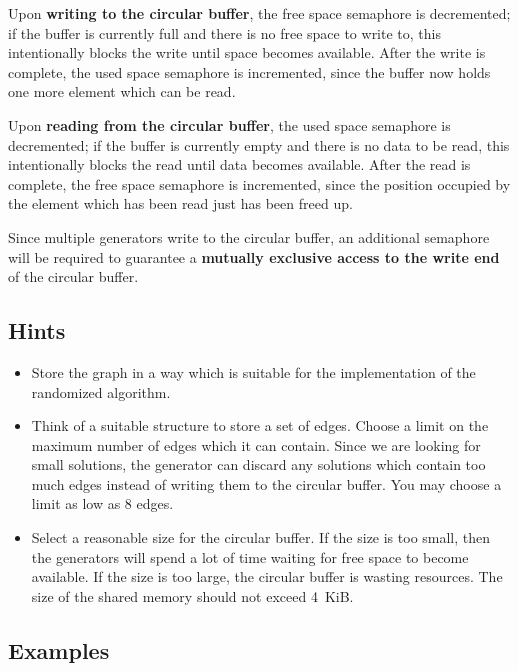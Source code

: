 Upon \textbf{writing to the circular buffer}, the free space semaphore is decremented;
if the buffer is currently full and there is no free space to write to,
this intentionally blocks the write until space becomes available.
After the write is complete, the used space semaphore is incremented,
since the buffer now holds one more element which can be read.

Upon \textbf{reading from the circular buffer}, the used space semaphore is decremented;
if the buffer is currently empty and there is no data to be read,
this intentionally blocks the read until data becomes available.
After the read is complete, the free space semaphore is incremented,
since the position occupied by the element which has been read just has been freed up.

Since multiple generators write to the circular buffer,
an additional semaphore will be required
to guarantee a \textbf{mutually exclusive access to the write end} of the circular buffer.

\subsection*{Hints}
\begin{itemize}
\item Store the graph in a way which is suitable for the implementation of the randomized algorithm.

\item Think of a suitable structure to store a set of edges.
Choose a limit on the maximum number of edges which it can contain.
Since we are looking for small solutions,
the generator can discard any solutions which contain too much edges
instead of writing them to the circular buffer.
You may choose a limit as low as 8 edges.

\item Select a reasonable size for the circular buffer.
If the size is too small,
then the generators will spend a lot of time waiting for free space to become available.
If the size is too large,
the circular buffer is wasting resources.
The size of the shared memory should not exceed 4~KiB.

\end{itemize}

\clearpage
\subsection*{Examples}
\setlength{\columnsep}{-20mm}

